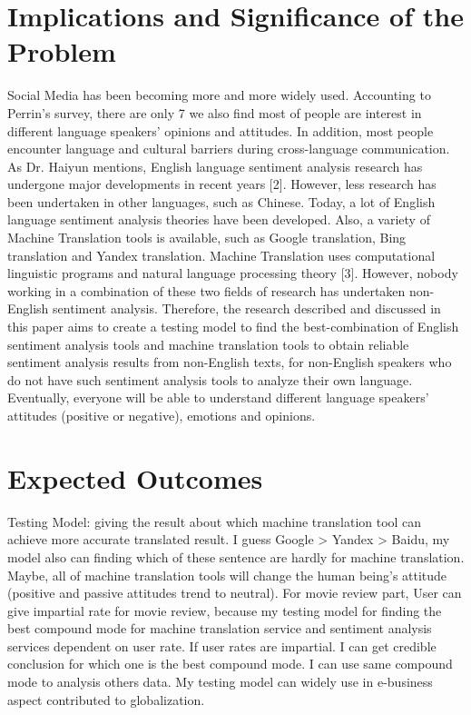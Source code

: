 \documentclass[conference,compsoc]{IEEEtran}
\begin{document}
\section{Implications and Significance of the Problem}
Social Media has been becoming more and more widely used. Accounting to Perrin’s survey, there are only 7%
we also find most of people are interest in different language speakers’
opinions and attitudes. In addition, most people encounter language and cultural
barriers during cross-language communication. As Dr. Haiyun mentions, English
language sentiment analysis research has undergone major developments in recent
years [2]. However, less research has been undertaken in other languages, such
as Chinese. Today, a lot of English language sentiment analysis theories have
been developed. Also, a variety of Machine Translation tools is available, such
as Google translation, Bing translation and Yandex translation. Machine
Translation uses computational linguistic programs and natural language
processing theory [3]. However, nobody working in a combination of these two
fields of research has undertaken non-English sentiment analysis. Therefore, the
research described and discussed in this paper aims to create a testing model to
find the best-combination of English sentiment analysis tools and machine
translation tools to obtain reliable sentiment analysis results from non-English
texts, for non-English speakers who do not have such sentiment analysis tools to
analyze their own language. Eventually, everyone will be able to understand
different language speakers’ attitudes (positive or negative), emotions and
opinions.

\section{Expected Outcomes}
Testing Model: giving the result about which machine translation tool can achieve more accurate translated result. I guess Google > Yandex > Baidu, my model also can finding which of these sentence are hardly for machine translation.
Maybe, all of machine translation tools will change the human being’s attitude (positive and passive attitudes trend to neutral).
For movie review part, User can give impartial rate for movie review, because my testing model for finding the best compound mode for machine translation service and sentiment analysis services dependent on user rate. If user rates are impartial. I can get credible conclusion for which one is the best compound mode. I can use same compound mode to analysis others data.
My testing model can widely use in e-business aspect contributed to
globalization.
\end{document}
